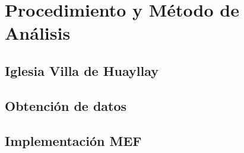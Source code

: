 \documentclass[doc, 12pt, a4paper, draftall]{apa7} %
\begin{document}




\frontmatter %

\renewcommand\contentsname{\centering Índice}
\tableofcontents
\newpage
\renewcommand\listtablename{\centering Índice de Tablas}
\listoftables
\newpage
\renewcommand\listfigurename{\centering Índice de Figuras}
\listoffigures
\newpage
\doublespacing

  







\mainmatter %












\section{Procedimiento y Método de Análisis}

\subsection{Iglesia Villa de Huayllay}
  
\subsection{Obtención de datos}

\subsection{Implementación MEF}
\end{document}
